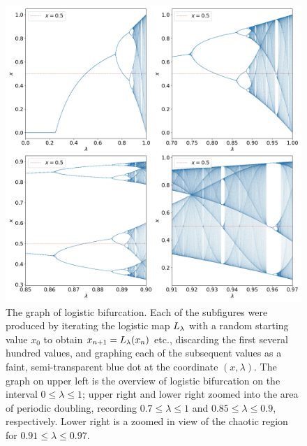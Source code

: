 \begin{figure}[htbp]
	\centering
	\includegraphics[width=\textwidth]{./figures/logistic.png}
	\caption{
		The graph of logistic bifurcation.
		Each of the subfigures were produced by iterating the logistic map $L_{\lambda}$ with a random starting value $x_0$ to obtain $x_{n+1} = L_{\lambda}(x_n)$ etc., discarding the first several hundred values, and graphing each of the subsequent values as a faint, semi-transparent blue dot at the coordinate $(x, \lambda)$.
		The graph on upper left is the overview of logistic bifurcation on the interval $0 \leq \lambda \leq 1$; upper right and lower right zoomed into the area of periodic doubling, recording $0.7 \leq \lambda \leq 1$ and $0.85 \leq \lambda \leq 0.9$, respectively. Lower right is a zoomed in view of the chaotic region for $ 0.91 \leq \lambda \leq 0.97$. 
	}
	\label{fig:logistic bifurcation overview}
\end{figure}

